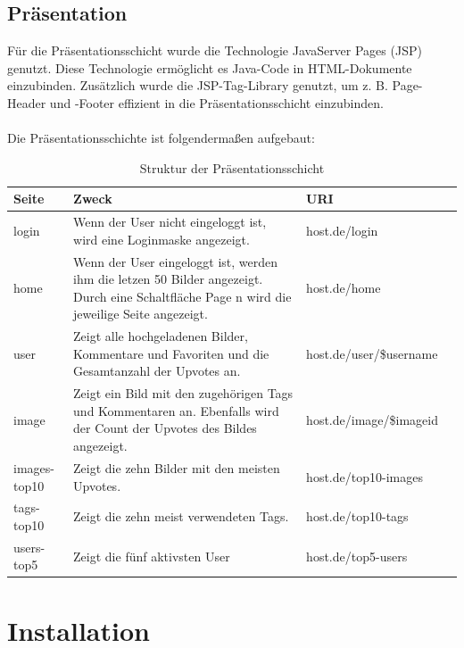 \documentclass[12pt, oneside, a4paper]{article}		%
\begin{document}
\subsection{Präsentation}

Für die Präsentationsschicht wurde die Technologie JavaServer Pages (JSP) genutzt. Diese Technologie ermöglicht es Java-Code in HTML-Dokumente einzubinden. Zusätzlich wurde die JSP-Tag-Library genutzt, um z. B. Page-Header und -Footer effizient in die Präsentationsschicht einzubinden. \\
\\
Die Präsentationsschichte ist folgendermaßen aufgebaut:	

\begin{table}[ht!]
\centering
\begin{tabular}{| p{1.9cm} | p{6.2cm} | p{6.2cm} | l}
\hline                       
\textbf{Seite}	& \textbf{Zweck}	& \textbf{URI}	\\
\hline
login	& Wenn der User nicht eingeloggt ist, wird eine Loginmaske angezeigt.	& host.de/login \\
\hline
home	& Wenn der User eingeloggt ist, werden ihm die letzen 50 Bilder angezeigt. Durch eine Schaltfläche Page n wird die jeweilige Seite angezeigt.	& host.de/home \\
\hline
user	& Zeigt alle hochgeladenen Bilder, Kommentare und Favoriten und die Gesamtanzahl der Upvotes an.	& host.de/user/\${username} \\
\hline
image	& Zeigt ein Bild mit den zugehörigen Tags und Kommentaren an. Ebenfalls wird der Count der Upvotes des Bildes angezeigt.	& host.de/image/\${imageid} \\
\hline
images-top10	& Zeigt die zehn Bilder mit den meisten Upvotes.	& host.de/top10-images \\
\hline
tags-top10	& Zeigt die zehn meist verwendeten Tags.	& host.de/top10-tags \\
\hline
users-top5	& Zeigt die fünf aktivsten User	& host.de/top5-users \\
\hline
\end{tabular}
\caption{Struktur der Präsentationsschicht}
\label{StructurePresentationlayer}
\end{table}

\newpage

\section{Installation}
\end{document}
